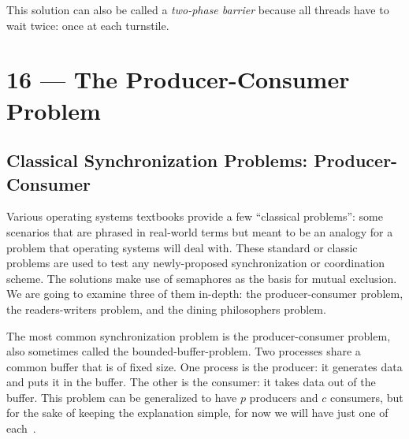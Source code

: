 \documentclass[a4paper]{report}
\begin{document}
This solution can also be called a \textit{two-phase barrier} because all threads have to wait twice: once at each turnstile.










\chapter*{16 --- The Producer-Consumer Problem}


\section*{Classical Synchronization Problems: Producer-Consumer}

Various operating systems textbooks provide a few ``classical problems'': some scenarios that are phrased in real-world terms but meant to be an analogy for a problem that operating systems will deal with. These standard or classic problems are used to test any newly-proposed synchronization or coordination scheme. The solutions make use of semaphores as the basis for mutual exclusion. We are going to examine three of them in-depth: the producer-consumer problem, the readers-writers problem, and the dining philosophers problem.

The most common synchronization problem is the producer-consumer problem, also sometimes called the bounded-buffer-problem. Two processes share a common buffer that is of fixed size. One process is the producer: it generates data and puts it in the buffer. The other is the consumer: it takes data out of the buffer. This problem can be generalized to have $p$ producers and $c$ consumers, but for the sake of keeping the explanation simple, for now we will have just one of each~\cite{mos}.
\end{document}
